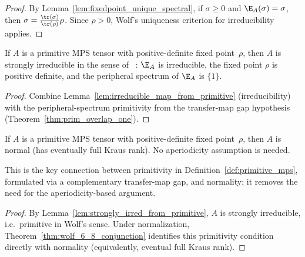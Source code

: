 \begin{proof}
    \leanok
    By Lemma~\ref{lem:fixedpoint_unique_spectral},
    if $\sigma \ge 0$ and $\E_A(\sigma) = \sigma$, then
    $\sigma = \frac{\tr(\sigma)}{\tr(\rho)} \rho$.
    Since $\rho > 0$, Wolf's uniqueness criterion for
    irreducibility applies.
\end{proof}

\begin{lemma}%
    \label{lem:strongly_irred_from_primitive}
    \leanok
    If $A$ is a primitive MPS tensor with positive-definite fixed
    point~$\rho$, then $A$ is strongly irreducible in the sense of~%
    \cite[Proposition~3(c)]{Sanz2010Quantum}:
    $\E_A$ is irreducible, the fixed point $\rho$ is positive
    definite, and the peripheral spectrum of $\E_A$ is $\{1\}$.
\end{lemma}

\begin{proof}
    \leanok
    Combine Lemma~\ref{lem:irreducible_map_from_primitive}
    (irreducibility) with the peripheral-spectrum primitivity from
    the transfer-map gap hypothesis
    (Theorem~\ref{thm:prim_overlap_one}).
\end{proof}

\begin{theorem}%
    \label{thm:normal_from_primitive_posdef}
    \leanok
    If $A$ is a primitive MPS tensor with positive-definite fixed
    point~$\rho$, then $A$ is normal
    (has eventually full Kraus rank).
    No aperiodicity assumption is needed.

    This is the key connection between primitivity in
    Definition~\ref{def:primitive_mps}, formulated via a complementary
    transfer-map gap, and normality; it removes the need for the
    aperiodicity-based argument.
\end{theorem}

\begin{proof}
    \leanok
    By Lemma~\ref{lem:strongly_irred_from_primitive},
    $A$ is strongly irreducible, i.e.\ primitive in Wolf's sense.
    Under normalization, Theorem~\ref{thm:wolf_6_8_conjunction}
    identifies this primitivity condition directly with normality
    (equivalently, eventual full Kraus rank).
\end{proof}

